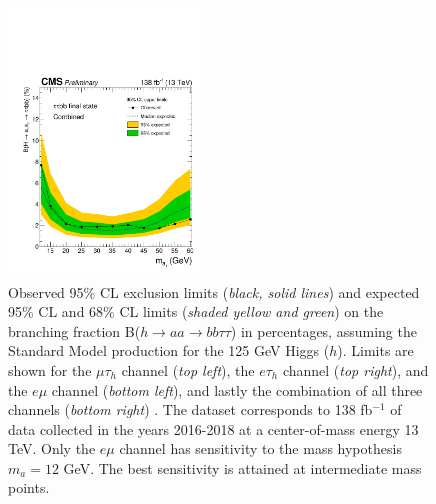 \begin{figure}[h!]
\begin{center}
        \includegraphics[width=0.45\textwidth]{figures/ch-10-results/Limit_all_prelim.pdf}
    \end{center}
    \caption[Observed 95\% CL exclusion limits (\textit{black, solid lines}) and expected 95\% CL and 68\% CL limits (\textit{shaded yellow and green}) on the branching fraction B($h\rightarrow aa\rightarrow bb\tau\tau$) in percentages, assuming the Standard Model production for the 125 GeV Higgs ($h$). Limits are shown for the $\mu\tau_{h}$ channel (\textit{top left}), the $e\tau_{h}$ channel (\textit{top right}), and the $e\mu$ channel (\textit{bottom left}), and lastly the combination of all three channels (\textit{bottom right}) The dataset corresponds to 138 fb$^{-1}$ of data collected in the years 2016-2018 at a center-of-mass energy 13 TeV.]{Observed 95\% CL exclusion limits (\textit{black, solid lines}) and expected 95\% CL and 68\% CL limits (\textit{shaded yellow and green}) on the branching fraction B($h\rightarrow aa\rightarrow bb\tau\tau$) in percentages, assuming the Standard Model production for the 125 GeV Higgs ($h$). Limits are shown for the $\mu\tau_{h}$ channel (\textit{top left}), the $e\tau_{h}$ channel (\textit{top right}), and the $e\mu$ channel (\textit{bottom left}), and lastly the combination of all three channels (\textit{bottom right}) \cite{CMS-AN-20-213}. The dataset corresponds to 138 fb$^{-1}$ of data collected in the years 2016-2018 at a center-of-mass energy 13 TeV. Only the $e\mu$ channel has sensitivity to the mass hypothesis $m_a = 12$ GeV. The best sensitivity is attained at intermediate mass points.}
    \label{fig:results_limits}
\end{figure}

